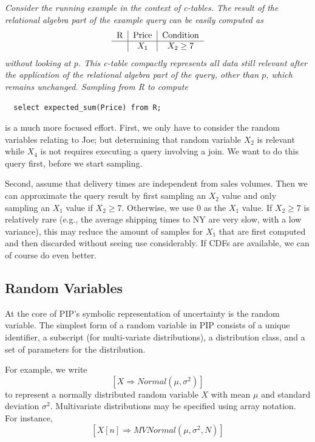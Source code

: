 \begin{example}\em
Consider the running example in the context of c-tables. The result of the relational algebra part of the
example query can be easily computed as
\[
\begin{tabular}{c|c|c}
R & Price & Condition \\
\hline
& $X_1$ & $X_2 \ge 7$ \\
\end{tabular}
\]
without looking at $p$.
This c-table compactly represents all data still relevant after the
application of the relational algebra part of the query, other than $p$,
which remains unchanged.
Sampling from R to compute
{\small\begin{verbatim}
  select expected_sum(Price) from R;
\end{verbatim}}
is a much more focused effort.
First, we only have to consider the random variables relating to Joe;
but determining that random variable $X_2$ is relevant while $X_4$
is not requires
executing a query involving a join. We want to do this query first, before
we start sampling.

Second, assume that delivery times are
independent from sales volumes. Then we can approximate the
query result
by first sampling an $X_2$ value and only sampling an $X_1$ value if $X_2 \ge 7$.
Otherwise, we use $0$ as the $X_1$ value.
If $X_2 \ge 7$ is relatively rare (e.g., the average shipping times to NY are
very slow, with a low variance), this may reduce the amount of samples
for $X_1$ that are first computed and then discarded without seeing use
considerably.
If CDFs are available, we can of course do even better.
%
\end{example}

\subsection{Random Variables}

At the core of PIP's symbolic representation of uncertainty is the random variable.  The simplest form of a random variable in PIP consists of a unique identifier, a subscript (for multi-variate distributions), a distribution class, and a set of parameters for the distribution.  

For example, we write 
$$[X\Rightarrow Normal(\mu,\sigma^2)]$$
 to represent a normally distributed random variable $X$ with mean $\mu$ and standard deviation $\sigma^2$.  Multivariate distributions may be specified using array notation.  For instance,
$$[X[n]\Rightarrow MVNormal(\mu, \sigma^2, N)]$$

